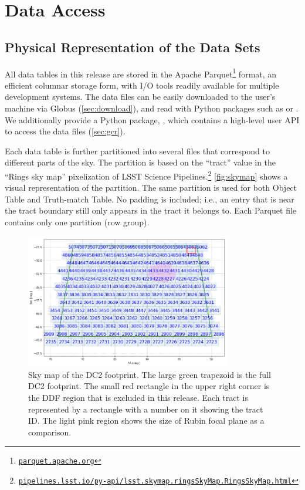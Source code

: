 \documentclass[modern]{descnote}
\newcommand*{\https}[1]{\href{https://#1}{\nolinkurl{#1}}}
\begin{document}
\section{Data Access}
\label{sec:access}


\subsection{Physical Representation of the Data Sets}
\label{sec:representation}

All data tables in this release are stored in the Apache Parquet\footnote{\https{parquet.apache.org}} format, an efficient columnar storage form, with I/O tools readily available for multiple development systems. 
The data files can be easily downloaded to the user's machine via Globus (\autoref{sec:download}), and read with Python packages such as  or .
We additionally provide a Python package, , which contains a high-level user API to access the data files (\autoref{sec:gcr}). 

Each data table is further partitioned into several files that correspond to different parts of the sky. The partition is based on the ``tract'' value in the ``Rings sky map'' pixelization of LSST Science Pipelines.\footnote{\https{pipelines.lsst.io/py-api/lsst.skymap.ringsSkyMap.RingsSkyMap.html}} \autoref{fig:skymap} shows a visual representation of the partition. The same partition is used for both Object Table and Truth-match Table. No padding is included; i.e., an entry that is near the tract boundary still only appears in the tract it belongs to. Each Parquet file contains only one partition (row group). 

\begin{figure}[tbh!]
    \centering
    \includegraphics[width=0.8\textwidth]{figs/skymap.png}
    \caption{Sky map of the DC2 footprint. The large green trapezoid is the full DC2 footprint. The small red rectangle in the upper right corner is the DDF region that is excluded in this release. Each tract is represented by a rectangle with a number on it showing the tract ID. The light pink region shows the size of Rubin focal plane as a comparison.}
    \label{fig:skymap}
\end{figure}
\end{document}

